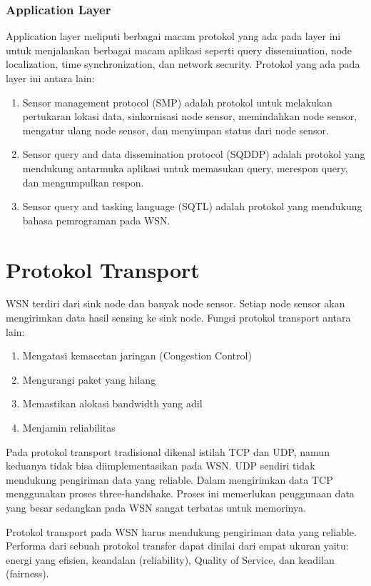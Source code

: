 \subsubsection{Application Layer}
Application layer meliputi berbagai macam protokol yang ada pada layer ini untuk menjalankan berbagai macam aplikasi seperti query dissemination, node localization, time synchronization, dan network security. Protokol yang ada pada layer ini antara lain:
\begin{enumerate}
	\item Sensor management protocol (SMP) adalah protokol untuk melakukan pertukaran lokasi data, sinkornisasi node sensor, memindahkan node sensor, mengatur ulang node sensor, dan menyimpan status dari node sensor.
	\item Sensor query and data dissemination protocol (SQDDP) adalah protokol yang mendukung antarmuka aplikasi untuk memasukan query, merespon query, dan mengumpulkan respon.
	\item Sensor query and tasking language (SQTL) adalah protokol yang mendukung bahasa pemrograman pada WSN.
\end{enumerate}


\section{Protokol Transport}
WSN terdiri dari sink node dan banyak node sensor. Setiap node sensor akan mengirimkan data hasil sensing ke sink node. Fungsi protokol transport antara lain:
\begin{enumerate}
	\item Mengatasi kemacetan jaringan (Congestion Control)
	\item Mengurangi paket yang hilang
	\item Memastikan alokasi bandwidth yang adil
	\item Menjamin reliabilitas
\end{enumerate}

Pada protokol transport tradisional dikenal istilah TCP dan UDP, namun keduanya tidak bisa diimplementasikan pada WSN. UDP sendiri tidak mendukung pengiriman data yang reliable. Dalam mengirimkan data TCP menggunakan proses three-handshake. Proses ini memerlukan penggunaan data yang besar sedangkan pada WSN sangat terbatas untuk memorinya. 

Protokol transport pada WSN harus mendukung pengiriman data yang reliable. Performa dari sebuah protokol transfer dapat dinilai dari empat ukuran yaitu: energi yang efisien, keandalan (reliability), Quality of Service, dan keadilan (fairness).

